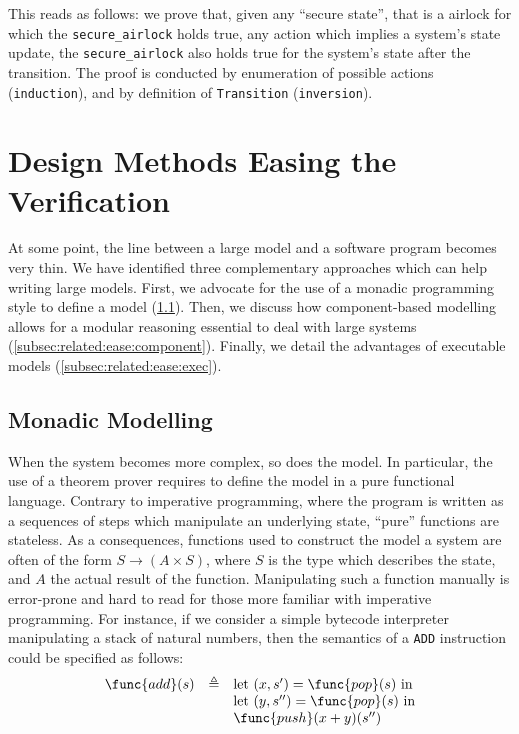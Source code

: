 \begin{example}
  \inputminted[firstline=40,lastline=57]{coq}{Listings/Airlock.v}

  This reads as follows: we prove that, given any ``secure state'', that is a
  airlock for which the \texttt{secure\_airlock} holds true, any action which
  implies a system's state update, the \texttt{secure\_airlock} also holds true
  for the system's state after the transition.
  The proof is conducted by enumeration of possible actions
  (\texttt{induction}), and by definition of \texttt{Transition}
  (\texttt{inversion}).
\end{example}


\section{Design Methods Easing the Verification}
\label{sec:related:ease}

At some point, the line between a large model and a software program becomes
very thin.
%
We have identified three complementary approaches which can help writing large
models.
%
First, we advocate for the use of a monadic programming style to define a model
(\ref{subsec:related:ease:monad}).
%
Then, we discuss how component-based modelling allows for a modular reasoning
essential to deal with large systems (\ref{subsec:related:ease:component}).
%
Finally, we detail the advantages of executable models
(\ref{subsec:related:ease:exec}).

\subsection{Monadic Modelling}
\label{subsec:related:ease:monad}

When the system becomes more complex, so does the model.
%
In particular, the use of a theorem prover requires to define the model in a
pure functional language.
%
Contrary to imperative programming, where the program is written as a sequences
of steps which manipulate an underlying state, ``pure'' functions are stateless.
%
As a consequences, functions used to construct the model a system are often of
the form $S \rightarrow (A \times S)$, where $S$ is the type which describes the
state, and $A$ the actual result of the function.
%
Manipulating such a function manually is error-prone and hard to read for those
more familiar with imperative programming.
%
For instance, if we consider a simple bytecode interpreter manipulating a stack
of natural numbers, then the semantics of a \texttt{ADD} instruction could be
specified as follows:
%
\[\begin{array}{rcl}
    \func{add}(s) &\triangleq& \text{let }(x, s') = \func{pop}(s) \text{ in} \\
                  &          & \text{let }(y, s'') = \func{pop}(s) \text{ in} \\
                  &          & \func{push}(x + y)(s'')
  \end{array}\]

